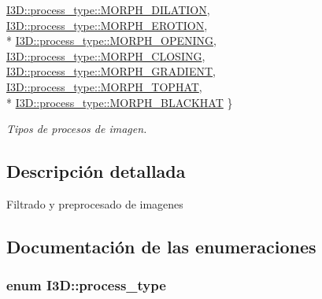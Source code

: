 \begin{DoxyCompactItemize}
\hyperlink{group___img_proc_ggaa7be5aaaa0e9ec5885c5bd72f41dad47aa62af16982d33a21604898439056a9d2}{I3\+D\+::process\+\_\+type\+::\+M\+O\+R\+P\+H\+\_\+\+D\+I\+L\+A\+T\+I\+ON}, 
\hyperlink{group___img_proc_ggaa7be5aaaa0e9ec5885c5bd72f41dad47ad8e41fdfaeb278c77596eb6a3c8e0f04}{I3\+D\+::process\+\_\+type\+::\+M\+O\+R\+P\+H\+\_\+\+E\+R\+O\+T\+I\+ON}, 
\\*
\hyperlink{group___img_proc_ggaa7be5aaaa0e9ec5885c5bd72f41dad47a11d7095a94eea40bb9860b9e0b09c23d}{I3\+D\+::process\+\_\+type\+::\+M\+O\+R\+P\+H\+\_\+\+O\+P\+E\+N\+I\+NG}, 
\hyperlink{group___img_proc_ggaa7be5aaaa0e9ec5885c5bd72f41dad47a622378b015185b105eef552549a5cf92}{I3\+D\+::process\+\_\+type\+::\+M\+O\+R\+P\+H\+\_\+\+C\+L\+O\+S\+I\+NG}, 
\hyperlink{group___img_proc_ggaa7be5aaaa0e9ec5885c5bd72f41dad47ad9bd47a1f0c0b296e5db72dc9801b8e6}{I3\+D\+::process\+\_\+type\+::\+M\+O\+R\+P\+H\+\_\+\+G\+R\+A\+D\+I\+E\+NT}, 
\hyperlink{group___img_proc_ggaa7be5aaaa0e9ec5885c5bd72f41dad47a791ac3ec759e1234cb61e8df76dd15e3}{I3\+D\+::process\+\_\+type\+::\+M\+O\+R\+P\+H\+\_\+\+T\+O\+P\+H\+AT}, 
\\*
\hyperlink{group___img_proc_ggaa7be5aaaa0e9ec5885c5bd72f41dad47abab238f32734ecfb0155ddec17535fd7}{I3\+D\+::process\+\_\+type\+::\+M\+O\+R\+P\+H\+\_\+\+B\+L\+A\+C\+K\+H\+AT}
 \}\begin{DoxyCompactList}\small\item\em Tipos de procesos de imagen. \end{DoxyCompactList}
\end{DoxyCompactItemize}


\subsection{Descripción detallada}
Filtrado y preprocesado de imagenes 

\subsection{Documentación de las enumeraciones}
\subsubsection[{\texorpdfstring{process\+\_\+type}{process_type}}]{\setlength{\rightskip}{0pt plus 5cm}enum {\bf I3\+D\+::process\+\_\+type}\hspace{0.3cm}{\ttfamily [strong]}}\hypertarget{group___img_proc_gaa7be5aaaa0e9ec5885c5bd72f41dad47}{}\label{group___img_proc_gaa7be5aaaa0e9ec5885c5bd72f41dad47}


